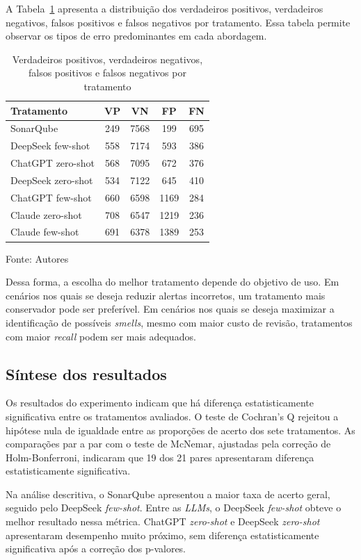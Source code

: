 A Tabela~\ref{tab:vp-vn-fp-fn-tratamento} apresenta a distribuição dos verdadeiros positivos, verdadeiros negativos, falsos positivos e falsos negativos por tratamento. Essa tabela permite observar os tipos de erro predominantes em cada abordagem.

\begin{table}[H]
\centering
\caption{Verdadeiros positivos, verdadeiros negativos, falsos positivos e falsos negativos por tratamento}
\label{tab:vp-vn-fp-fn-tratamento}
\begin{tabular}{lcccc}
\hline
Tratamento & VP & VN & FP & FN \\
\hline
SonarQube & 249 & 7568 & 199 & 695 \\
DeepSeek few-shot & 558 & 7174 & 593 & 386 \\
ChatGPT zero-shot & 568 & 7095 & 672 & 376 \\
DeepSeek zero-shot & 534 & 7122 & 645 & 410 \\
ChatGPT few-shot & 660 & 6598 & 1169 & 284 \\
Claude zero-shot & 708 & 6547 & 1219 & 236 \\
Claude few-shot & 691 & 6378 & 1389 & 253 \\
\hline
\end{tabular}

Fonte: Autores
\end{table}

Dessa forma, a escolha do melhor tratamento depende do objetivo de uso. Em cenários nos quais se deseja reduzir alertas incorretos, 
um tratamento mais conservador pode ser preferível. Em cenários nos quais se deseja maximizar a identificação de possíveis \textit{smells}, 
mesmo com maior custo de revisão, tratamentos com maior \textit{recall} podem ser mais adequados.

\subsection{Síntese dos resultados}

Os resultados do experimento indicam que há diferença estatisticamente significativa entre os tratamentos avaliados. 
O teste de Cochran's Q rejeitou a hipótese nula de igualdade entre as proporções de acerto dos sete tratamentos. 
As comparações par a par com o teste de McNemar, ajustadas pela correção de Holm-Bonferroni, indicaram que 19 dos 21 pares 
apresentaram diferença estatisticamente significativa.


Na análise descritiva, o SonarQube apresentou a maior taxa de acerto geral, seguido pelo DeepSeek \textit{few-shot}. 
Entre as \textit{LLMs}, o DeepSeek \textit{few-shot} obteve o melhor resultado nessa métrica. ChatGPT \textit{zero-shot} e DeepSeek \textit{zero-shot} 
apresentaram desempenho muito próximo, sem diferença estatisticamente significativa após a correção dos p-valores.

